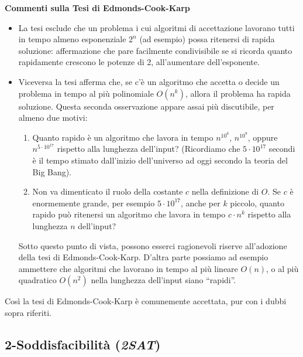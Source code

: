 \documentclass[12pt,a4paper]{report}
\theoremstyle{definition}
\begin{document}
\noindent \textbf{Commenti sulla Tesi di Edmonds-Cook-Karp}\label{commenti_tesi_e-c-k}
\begin{itemize}
\item La tesi esclude che un problema i cui algoritmi di accettazione lavorano tutti in tempo almeno esponenziale $2^n$ (ad esempio) possa ritenersi di rapida soluzione: affermazione che pare facilmente condivisibile se si ricorda quanto rapidamente crescono le potenze di 2, all'aumentare dell'esponente.
\item Viceversa la tesi afferma che, se c'è un algoritmo che accetta o decide un problema in tempo al più polinomiale $O(n^k)$, allora il problema ha rapida soluzione. Questa seconda osservazione appare assai più discutibile, per almeno due motivi:
\begin{enumerate}
\item Quanto rapido è un algoritmo che lavora in tempo $n^{10^6}$, $n^{10^9}$, oppure $n^{5 \cdot 10^{17}}$ rispetto alla lunghezza dell'input? (Ricordiamo che $5 \cdot 10^{17}$ secondi è il tempo stimato dall'inizio dell'universo ad oggi secondo la teoria del Big Bang).
\item Non va dimenticato il ruolo della costante $c$ nella definizione di $O$. Se $c$ è enormemente grande, per esempio $5 \cdot 10^{17}$, anche per $k$ piccolo, quanto rapido può ritenersi un algoritmo che lavora in tempo $c \cdot n^k$ rispetto alla lunghezza $n$ dell'input?
\end{enumerate}
Sotto questo punto di vista, possono esserci ragionevoli riserve all'adozione della tesi di Edmonds-Cook-Karp. D'altra parte possiamo ad esempio ammettere che algoritmi che lavorano in tempo al più lineare $O(n)$, o al più quadratico $O(n^2)$ nella lunghezza dell'input siano ``rapidi''.
\end{itemize}

Così la tesi di Edmonds-Cook-Karp è comunemente accettata, pur con i dubbi sopra riferiti.


\subsection{2-Soddisfacibilità (\emph{2SAT})}
\end{document}

